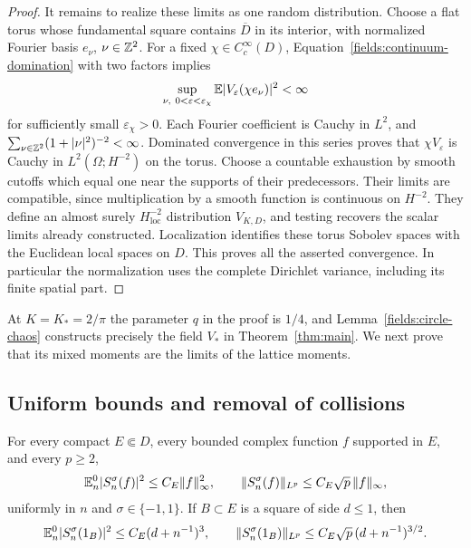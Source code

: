\begin{proof}
It remains to realize these limits as one random distribution.
Choose a flat torus whose fundamental square contains $\overline D$
in its interior, with normalized Fourier basis
$e_\nu$, $\nu\in\mathbb Z^2$.  For a fixed
$\chi\in C_c^\infty(D)$, Equation~\eqref{fields:continuum-domination}
with two factors implies
\[
 \sup_{\nu,\ 0<\varepsilon<\varepsilon_\chi}
       \E|V_\varepsilon(\chi e_\nu)|^2<\infty
\]
for sufficiently small $\varepsilon_\chi>0$.
Each Fourier coefficient is Cauchy in $L^2$, and
$\sum_{\nu\in\mathbb Z^2}(1+|\nu|^2)^{-2}<\infty$.
Dominated convergence in this series proves that
$\chi V_\varepsilon$ is Cauchy in $L^2(\Omega;H^{-2})$ on
the torus.  Choose a countable exhaustion by smooth cutoffs
which equal one near the supports of their predecessors.
Their limits are compatible, since multiplication by a smooth
function is continuous on $H^{-2}$.  They define an almost surely
$H^{-2}_{\mathrm{loc}}$ distribution $V_{K,D}$, and testing
recovers the scalar limits already constructed.  Localization
identifies these torus Sobolev spaces with the Euclidean local
spaces on $D$.  This proves all the asserted convergence.
In particular the normalization uses the complete Dirichlet
variance, including its finite spatial part.
\end{proof}

At $K=K_*=2/\pi$ the parameter $q$ in the proof is $1/4$,
and Lemma~\ref{fields:circle-chaos} constructs precisely the
field $V_*$ in Theorem~\ref{thm:main}.  We next prove that its
mixed moments are the limits of the lattice moments.

\subsection{Uniform bounds and removal of collisions}

\begin{lemma}
\label{fields:moment-bounds}
For every compact $E\Subset D$, every bounded complex function $f$
supported in $E$, and every $p\geq2$,
\begin{equation}\label{fields:test-bounds}
 \mathbb E_n^0|S_n^\sigma(f)|^2\leq C_E\|f\|_\infty^2,
 \qquad
 \|S_n^\sigma(f)\|_{L^p}\leq C_E\sqrt p\,\|f\|_\infty,
\end{equation}
uniformly in $n$ and $\sigma\in\{-1,1\}$.
If $B\subset E$ is a square of side $d\leq1$, then
\begin{equation}\label{fields:box-bounds}
 \mathbb E_n^0|S_n^\sigma(1_B)|^2\leq C_E(d+n^{-1})^3,
 \qquad
 \|S_n^\sigma(1_B)\|_{L^p}
       \leq C_E\sqrt p\,(d+n^{-1})^{3/2}.
\end{equation}
\end{lemma}


